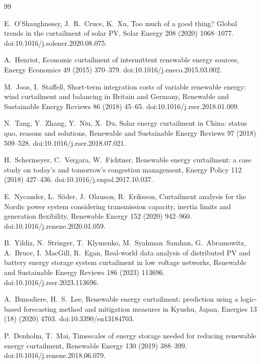 \documentclass[preprint,3p,times]{elsarticle}
\begin{document}
\begin{thebibliography}{99}

E.~O'Shaughnessy, J.~R.~Cruce, K.~Xu,
Too much of a good thing? Global trends in the curtailment of solar PV,
Solar Energy 208 (2020) 1068--1077.
doi:10.1016/j.solener.2020.08.075.

A.~Henriot,
Economic curtailment of intermittent renewable energy sources,
Energy Economics 49 (2015) 370--379.
doi:10.1016/j.eneco.2015.03.002.

M.~Joos, I.~Staffell,
Short-term integration costs of variable renewable energy: wind curtailment and balancing in Britain and Germany,
Renewable and Sustainable Energy Reviews 86 (2018) 45--65.
doi:10.1016/j.rser.2018.01.009.

N.~Tang, Y.~Zhang, Y.~Niu, X.~Du,
Solar energy curtailment in China: status quo, reasons and solutions,
Renewable and Sustainable Energy Reviews 97 (2018) 509--528.
doi:10.1016/j.rser.2018.07.021.

H.~Schermeyer, C.~Vergara, W.~Fichtner,
Renewable energy curtailment: a case study on today's and tomorrow's congestion management,
Energy Policy 112 (2018) 427--436.
doi:10.1016/j.enpol.2017.10.037.

E.~Nycander, L.~S\"oder, J.~Olauson, R.~Eriksson,
Curtailment analysis for the Nordic power system considering transmission capacity, inertia limits and generation flexibility,
Renewable Energy 152 (2020) 942--960.
doi:10.1016/j.renene.2020.01.059.

B.~Yildiz, N.~Stringer, T.~Klymenko, M.~Syahman~Samhan, G.~Abramowitz, A.~Bruce, I.~MacGill, R.~Egan,
Real-world data analysis of distributed PV and battery energy storage system curtailment in low voltage networks,
Renewable and Sustainable Energy Reviews 186 (2023) 113696.
doi:10.1016/j.rser.2023.113696.

A.~Bunodiere, H.~S.~Lee,
Renewable energy curtailment: prediction using a logic-based forecasting method and mitigation measures in Kyushu, Japan,
Energies 13 (18) (2020) 4703.
doi:10.3390/en13184703.

P.~Denholm, T.~Mai,
Timescales of energy storage needed for reducing renewable energy curtailment,
Renewable Energy 130 (2019) 388--399.
doi:10.1016/j.renene.2018.06.079.


\end{thebibliography}
\end{document}
